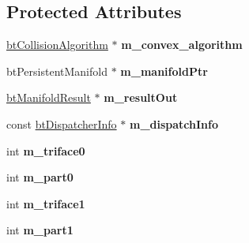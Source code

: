 \subsection*{Protected Attributes}
\begin{DoxyCompactItemize}
\item 
\hypertarget{classbt_g_impact_collision_algorithm_a237dfeb55e35275fbf185b1be557dd7a}{\hyperlink{classbt_collision_algorithm}{bt\+Collision\+Algorithm} $\ast$ {\bfseries m\+\_\+convex\+\_\+algorithm}}\label{classbt_g_impact_collision_algorithm_a237dfeb55e35275fbf185b1be557dd7a}

\item 
\hypertarget{classbt_g_impact_collision_algorithm_a4b02e001372b1a70393c6451cd30afd7}{bt\+Persistent\+Manifold $\ast$ {\bfseries m\+\_\+manifold\+Ptr}}\label{classbt_g_impact_collision_algorithm_a4b02e001372b1a70393c6451cd30afd7}

\item 
\hypertarget{classbt_g_impact_collision_algorithm_a7bebb0f1631641a432d0b353dda6ebad}{\hyperlink{classbt_manifold_result}{bt\+Manifold\+Result} $\ast$ {\bfseries m\+\_\+result\+Out}}\label{classbt_g_impact_collision_algorithm_a7bebb0f1631641a432d0b353dda6ebad}

\item 
\hypertarget{classbt_g_impact_collision_algorithm_a24631f76478efcd285f4b3bfb6bd5b56}{const \hyperlink{structbt_dispatcher_info}{bt\+Dispatcher\+Info} $\ast$ {\bfseries m\+\_\+dispatch\+Info}}\label{classbt_g_impact_collision_algorithm_a24631f76478efcd285f4b3bfb6bd5b56}

\item 
\hypertarget{classbt_g_impact_collision_algorithm_aecfe1ce2023c372295c2b93941b050d8}{int {\bfseries m\+\_\+triface0}}\label{classbt_g_impact_collision_algorithm_aecfe1ce2023c372295c2b93941b050d8}

\item 
\hypertarget{classbt_g_impact_collision_algorithm_a41e0e286a07df8172b640489a128254c}{int {\bfseries m\+\_\+part0}}\label{classbt_g_impact_collision_algorithm_a41e0e286a07df8172b640489a128254c}

\item 
\hypertarget{classbt_g_impact_collision_algorithm_a6bdf9734111e50142e1ebe1870922dbc}{int {\bfseries m\+\_\+triface1}}\label{classbt_g_impact_collision_algorithm_a6bdf9734111e50142e1ebe1870922dbc}

\item 
\hypertarget{classbt_g_impact_collision_algorithm_a71445213f3c35026b43d7dd8db1de71d}{int {\bfseries m\+\_\+part1}}\label{classbt_g_impact_collision_algorithm_a71445213f3c35026b43d7dd8db1de71d}

\end{DoxyCompactItemize}
